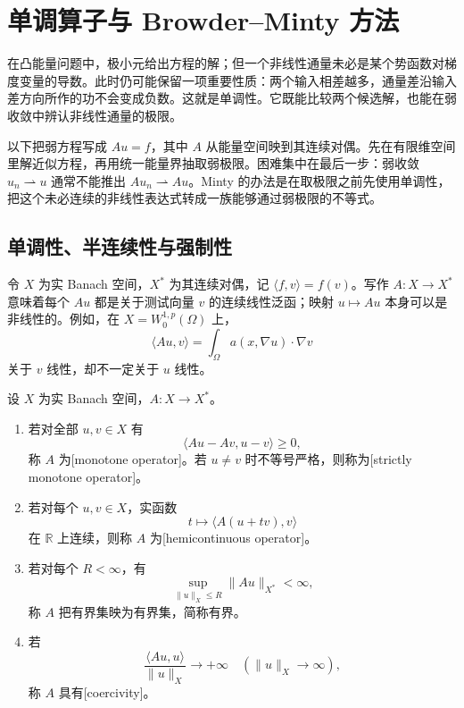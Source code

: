 \section{单调算子与 Browder–Minty 方法}
\label{b2:sec:H204}

在凸能量问题中，极小元给出方程的解；但一个非线性通量未必是某个势函数对梯度变量的导数。此时仍可能保留一项重要性质：两个输入相差越多，通量差沿输入差方向所作的功不会变成负数。这就是单调性。它既能比较两个候选解，也能在弱收敛中辨认非线性通量的极限。

\ProseParagraphBreak

以下把弱方程写成 \(Au=f\)，其中 \(A\) 从能量空间映到其连续对偶。先在有限维空间里解近似方程，再用统一能量界抽取弱极限。困难集中在最后一步：弱收敛 \(u_n\rightharpoonup u\) 通常不能推出 \(Au_n\rightharpoonup Au\)。Minty 的办法是在取极限之前先使用单调性，把这个未必连续的非线性表达式转成一族能够通过弱极限的不等式。

\subsection{单调性、半连续性与强制性}
\label{b2:subsec:H20401}

令 \(X\) 为实 Banach 空间，\(X^*\) 为其连续对偶，记
\(\langle f,v\rangle=f(v)\)。写作 \(A:X\to X^*\) 意味着每个 \(Au\) 都是关于测试向量 \(v\) 的连续线性泛函；映射 \(u\mapsto Au\) 本身可以是非线性的。例如，在 \(X=W_0^{1,p}(\Omega)\) 上，
\[
 \langle Au,v\rangle=\int_\Omega a(x,\nabla u)\cdot\nabla v
\]
关于 \(v\) 线性，却不一定关于 \(u\) 线性。

\begin{definition}[单调算子的结构条件]\label{b2:def:H4-monotone-conditions}
设 \(X\) 为实 Banach 空间，\(A:X\to X^*\)。
\begin{enumerate}
\item\label{b2:item:H4-monotone}
若对全部 \(u,v\in X\) 有
\[
 \langle Au-Av,u-v\rangle\ge0,
\]
称 \(A\) 为[monotone operator]。若 \(u\ne v\) 时不等号严格，则称为[strictly monotone operator]。
\item\label{b2:item:H4-hemi}
若对每个 \(u,v\in X\)，实函数
\[
 t\longmapsto\langle A(u+tv),v\rangle
\]
在 \(\mathbb R\) 上连续，则称 \(A\) 为[hemicontinuous operator]。
\item\label{b2:item:H4-bounded}
若对每个 \(R<\infty\)，有
\[
 \sup_{\|u\|_X\le R}\|Au\|_{X^*}<\infty,
\]
称 \(A\) 把有界集映为有界集，简称有界。
\item\label{b2:item:H4-coercive}
若
\[
 \frac{\langle Au,u\rangle}{\|u\|_X}
       \longrightarrow+\infty\quad(\|u\|_X\to\infty),
\]
称 \(A\) 具有[coercivity]。
\end{enumerate}
\end{definition}

